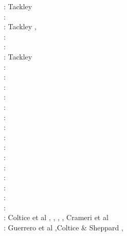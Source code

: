 \begin{itemize}
\begin{scriptsize}
\nineteenninetyfour: Tackley \cite{tackley94}\\
\nineteenninetyfive: \cite{scta95}\\
\nineteenninetysix: Tackley \cite{tack96}, \cite{tack96b}\\
\nineteenninetyeight: \cite{most98}\cite{thta98}\\
\twothousand: \cite{tack00}\cite{tack00b}\cite{tack00c}\cite{tack00d}\\
\twothousandone: Tackley \cite{tack01}\\
\twothousandtwo: \cite{falt02}\cite{tack02}\cite{taxi02}\\
\twothousandthree: \cite{taxi03}\\
\twothousandfour: \cite{xita04b}\cite{xita04}\cite{nata04}\cite{nata04b}\cite{nata04c}\cite{scmo04}\cite{yoog04}\\
\twothousandfive: \cite{grlt05}\cite{fasa05}\cite{nata05}\cite{nata05b}\cite{nabu05}\cite{yoog05}\\
\twothousandsix: \cite{mita06}\\
\twothousandseven: \cite{grlt07}\cite{grlt07b}\cite{heta07}\cite{tanh07}\\
\twothousandeight: \cite{deta08}\cite{hets08}\cite{heta08}\cite{sata08}\cite{nata08}\cite{tack08}\cite{vata08}\\
\twothousandnine: \cite{deta09}\cite{natd09}\cite{keta09}\\
\twothousandten: \cite{detn10}\cite{nata10}\cite{moht10}\cite{sate10}\cite{natd10}\\
\twothousandeleven: \cite{rota11}\cite{gokg11}\cite{nata11}\\
\twothousandtwelve: \cite{roct12}\cite{crtm12}\cite{cosr13}\cite{deyt12}\cite{dect12}\cite{arta12}\cite{natd12}
      \cite{ullc12}\\
\twothousandthirteen: \cite{ruts13}\cite{taab13}\cite{nata13}\cite{mowe13}\\
\twothousandfourteen: \cite{yadl14}\cite{crta14}\cite{roct14}\cite{cort14}\cite{becr14}\cite{lidt14}\cite{robg14}
      \cite{nata14}\\
\twothousandfifteen: \cite{bect15}\cite{delt15}\cite{lidt15}\cite{nani15}\\
\twothousandsixteen: \cite{sisc16}\cite{crta16}\\
\twothousandseventeen: Coltice et al \cite{cogu17}, \cite{pest17}, \cite{bahh17}, \cite{pact17}, 
Crameri et al \cite{crlt17}\\
\twothousandeighteen: Guerrero et al \cite{guld18},Coltice \& Sheppard \cite{cosh18}, 

\end{scriptsize}
\end{itemize}
